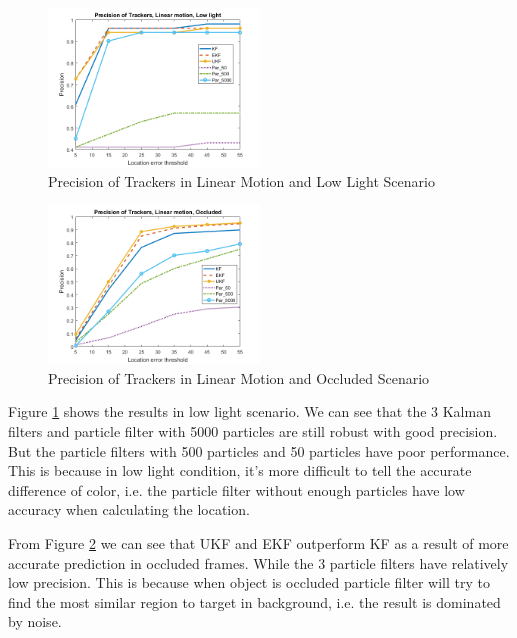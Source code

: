 \documentclass[10pt,twocolumn,letterpaper]{article}
\begin{document}
\begin{figure}[h]
     \centering
       \includegraphics[width=0.5\textwidth]{Linear_Low_Light.png}
        \caption{\small{Precision of Trackers in Linear Motion and Low Light Scenario}}
        \label{fig: liner low light}
 \end{figure}
 
 \begin{figure}[h]
     \centering
       \includegraphics[width=0.5\textwidth]{Linear_Occluded.png}
        \caption{\small{Precision of Trackers in Linear Motion and Occluded Scenario}}
        \label{fig: linear occ}
 \end{figure}
 
Figure \ref{fig: liner low light} shows the results in low light scenario. We can see that the 3 Kalman filters and particle filter with 5000 particles are still robust with good precision. But the particle filters with 500 particles and 50 particles have poor performance. This is because in low light condition, it's more difficult to tell the accurate difference of color, i.e. the particle filter without enough particles have low accuracy when calculating the location.
 
 
From Figure \ref{fig: linear occ} we can see that UKF and EKF outperform KF as a result of more accurate prediction in occluded frames. While the 3 particle filters have relatively low precision. This is because when object is occluded particle filter will try to find the most similar region to target in background, i.e. the result is dominated by noise.
\end{document}
